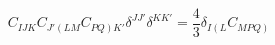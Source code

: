 \begin{equation}
C_{IJK} C_{J'\left(LM\right.} C_{\left.PQ\right)K'} \delta^{JJ'}\delta^{KK'}
= \frac 43 \delta_{I\left(L\right.} C_{\left.MPQ\right)}
\end{equation}


